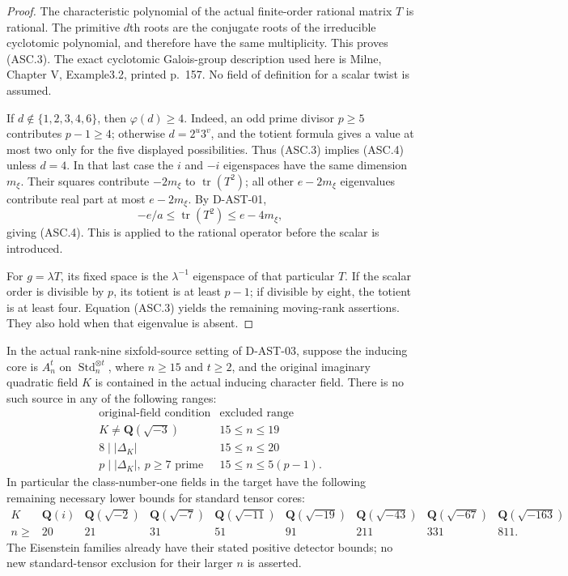 \begin{proof}
The characteristic polynomial of the actual finite-order rational
matrix $T$ is rational. The primitive $d$th roots are the conjugate
roots of the irreducible cyclotomic polynomial, and therefore have
the same multiplicity. This proves (ASC.3).
The exact cyclotomic Galois-group description used here is Milne,
Chapter V, Example3.2, printed p.~157.\cite{HD:MilneCFT2020}
No field of definition for a scalar twist is assumed.

If $d\notin\{1,2,3,4,6\}$, then $\varphi(d)\ge4$.
Indeed, an odd prime divisor $p\ge5$ contributes $p-1\ge4$;
otherwise $d=2^u3^v$, and the totient formula gives a value at
most two only for the five displayed possibilities.
Thus (ASC.3) implies (ASC.4) unless $d=4$.
In that last case the $i$ and $-i$ eigenspaces have the same
dimension $m_\xi$. Their squares contribute $-2m_\xi$ to
$\operatorname{tr}(T^2)$; all other $e-2m_\xi$ eigenvalues
contribute real part at most $e-2m_\xi$. By D-AST-01,
\[
       -e/a\le\operatorname{tr}(T^2)\le e-4m_\xi,
 \tag{ASC.5}
\]
giving (ASC.4). This is applied to the rational operator before
the scalar is introduced.

For $g=\lambda T$, its fixed space is the $\lambda^{-1}$
eigenspace of that particular $T$. If the scalar order is divisible
by $p$, its totient is at least $p-1$; if divisible by eight,
the totient is at least four. Equation (ASC.3) yields the remaining
moving-rank assertions. They also hold when that eigenvalue is absent.
\end{proof}

\begin{theorem}
\label{HD-AST-06}
In the actual rank-nine sixfold-source setting of D-AST-03, suppose
the inducing core is $A_n^t$ on $\operatorname{Std}_n^{\otimes t}$,
where $n\ge15$ and $t\ge2$, and the original imaginary quadratic
field $K$ is contained in the actual inducing character field.
There is no such source in any of the following ranges:
\[
\begin{array}{c|c}
\text{original-field condition}&\text{excluded range}\\\hline
K\ne\mathbf Q(\sqrt{-3})&15\le n\le19\\
8\mid|\Delta_K|&15\le n\le20\\
p\mid|\Delta_K|,\ p\ge7\text{ prime}&15\le n\le5(p-1).
\end{array}
 \tag{ASC.6}
\]
In particular the class-number-one fields in the target have the
following remaining necessary lower bounds for standard tensor cores:
\[
\begin{array}{c|rrrrrrrr}
K&\mathbf Q(i)&\mathbf Q(\sqrt{-2})&\mathbf Q(\sqrt{-7})&
\mathbf Q(\sqrt{-11})&\mathbf Q(\sqrt{-19})&
\mathbf Q(\sqrt{-43})&\mathbf Q(\sqrt{-67})&\mathbf Q(\sqrt{-163})\\\hline
n\ge&20&21&31&51&91&211&331&811.
\end{array}
 \tag{ASC.7}
\]
The Eisenstein families already have their stated positive detector
bounds; no new standard-tensor exclusion for their larger $n$ is asserted.
\end{theorem}

